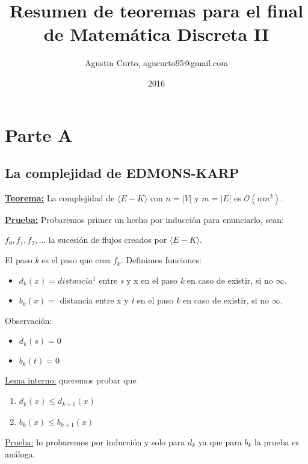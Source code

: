 \documentclass[12pt,a4paper]{report}
\author{Agustin Curto, agucurto95@gmail.com}
\title{Resumen de teoremas para el final \\ de Matemática Discreta  II}
\date{2016}
\providecommand{\abs}[1]{\lvert#1\rvert}
\begin{document}
\maketitle
\tableofcontents


\chapter{Parte A}

	\section{La complejidad de EDMONS-KARP}
	
		\textbf{\underline{Teorema:}} La complejidad de $\langle E-K \rangle$ con $n = \abs{V}$ y $m = \abs{E}$ es $\mathcal{O}(nm^{2})$.
	
		\textbf{\underline{Prueba:}} Probaremos primer un hecho por inducción para enunciarlo, sean:
		
		\begin{center}
			$f_{0}, f_{1}, f_{2}, \dotsc$ \;  la sucesión de flujos creados por $\langle E-K \rangle$.
		\end{center}
		
		El paso \textit{k} es el paso que crea $f_{k}$. Definimos funciones:
		
		\begin{itemize}
			\item $d_{k}(x) = distancia^{1}$ entre \textit{s} y x en el paso \textit{k} en caso de existir, si no $\infty$.
			\item $b_{k}(x) =$ distancia entre x y \textit{t} en el paso \textit{k} en caso de existir, si no $\infty$.
		\end{itemize}
	
		Observación:
			\begin{itemize}
				\item $d_{k}(s) = 0$
				\item $b_{k}(t) = 0$
			\end{itemize}
	
		\underline{Lema interno:} queremos probar que
		\begin{enumerate}
			\item $d_{k}(x) \leq d_{k+1}(x)$
			\item $b_{k}(x) \leq b_{k+1}(x)$
		\end{enumerate}
		
		\underline{Prueba:} lo probaremos por inducción y solo para $d_{k}$ ya que para $b_{k}$ la prueba es análoga.
		
\end{document}
